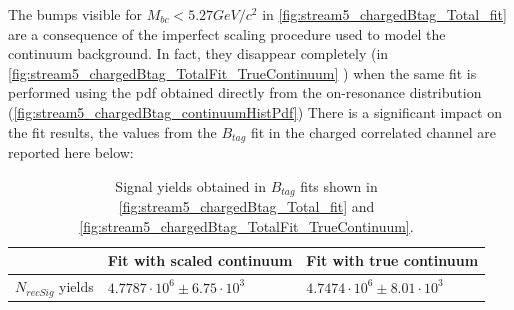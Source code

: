 The bumps visible for  $M_{bc} < 5.27 GeV/c^2$ in \cref{fig:stream5_chargedBtag_Total_fit}   
are a consequence of the imperfect scaling procedure used to model the continuum background. In fact, 
they disappear completely (in \cref{fig:stream5_chargedBtag_TotalFit_TrueContinuum} ) when the same fit is performed using 
the pdf obtained directly from the on-resonance distribution (\cref{fig:stream5_chargedBtag_continuumHistPdf})
There is a significant impact on the fit results, the values from the  $B_{tag}$ fit in the charged correlated channel are reported here below:

\begin{table}[H]
    \begin{tabular}{ |p{2.5cm}||p{4.5cm}| p{4.5cm}| }
    \hline
        \    &  Fit with scaled continuum &  Fit with true continuum\\
     \hline
     $N_{recSig}$  yields     &  $4.7787  \cdot 10^6 \pm 6.75 \cdot 10^3 $   & $ 4.7474  \cdot 10^6 \pm 8.01 \cdot 10^3$\\
   
     \hline
    \end{tabular}
    \caption{Signal yields obtained in $B_{tag}$ fits shown in \cref{fig:stream5_chargedBtag_Total_fit} and \cref{fig:stream5_chargedBtag_TotalFit_TrueContinuum}.}
    \end{table}
    \vspace{0.2 cm}

